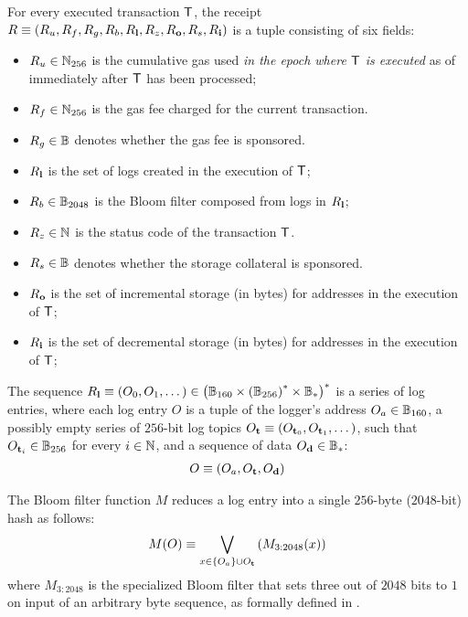 For every executed transaction $\textsf{T}$, the receipt $R\equiv \left(R_u, R_f, R_g, R_b, R_{\bf l}, R_z,R_{\bf o},R_s,R_{\bf i}\right)$ is a tuple consisting of six fields:
\begin{itemize}[nosep]
	\item $R_u\in\mathbb{N}_{256}$ is the cumulative gas used \emph{in the epoch where $\textsf{T}$ is executed} as of immediately after $\textsf{T}$ has been processed;
	
	\item $R_f\in\mathbb{N}_{256}$ is the gas fee charged for the current transaction. 
	
	\item $R_g \in \mathbb{B}$ denotes whether the gas fee is sponsored. 

	\item $R_{\bf l}$ is the set of logs created in the execution of $\textsf{T}$;

	\item $R_b\in\mathbb{B}_{2048}$ is the Bloom filter composed from logs in $R_{\bf l}$;

	\item $R_z\in\mathbb{N}$ is the status code of the transaction $\textsf{T}$.
	
	\item $R_s \in \mathbb{B}$ denotes whether the storage collateral is sponsored. 

	
	\item $R_{\bf o}$ is the set of incremental storage (in bytes) for addresses in the execution of $\textsf{T}$;

	\item $R_{\bf i}$ is the set of decremental storage (in bytes) for addresses in the execution of $\textsf{T}$;
\end{itemize}

The sequence $R_{\bf l}\equiv \left(O_0,O_1,\dots\right) \in \left(\mathbb{B}_{160} \times \left(\mathbb{B}_{256}\right)^*\times \mathbb{B}_*\right)^*$ is a series of log entries,
where each log entry $O$ is a tuple of the logger's address $O_a\in \mathbb{B}_{160}$,
a possibly empty series of $256$-bit log topics $O_{\bf t}\equiv \left(O_{{\bf t}_0}, O_{{\bf t}_1},\dots \right)$, such that $O_{{\bf t}_i}\in\mathbb{B}_{256}$ for every $i\in\mathbb{N}$,
and a sequence of data $O_{\bf d}\in\mathbb{B}_*$:
\begin{align}
	O\equiv \left( O_a, O_{\bf t}, O_{\bf d} \right)
\end{align}

The Bloom filter function $M$ reduces a log entry into a single $256$-byte ($2048$-bit) hash as follows:
\begin{align}
 	M(O)\equiv \bigvee_{x\in{\left \{{O_a} \right \}}\cup O_{\bf t}}\left( M_{3:2048}(x) \right)
\end{align} 
where $M_{3:2048}$ is the specialized Bloom filter that sets three out of $2048$ bits to $1$ on input of an arbitrary byte sequence,
as formally defined in \cite{ETH_yellow}.

